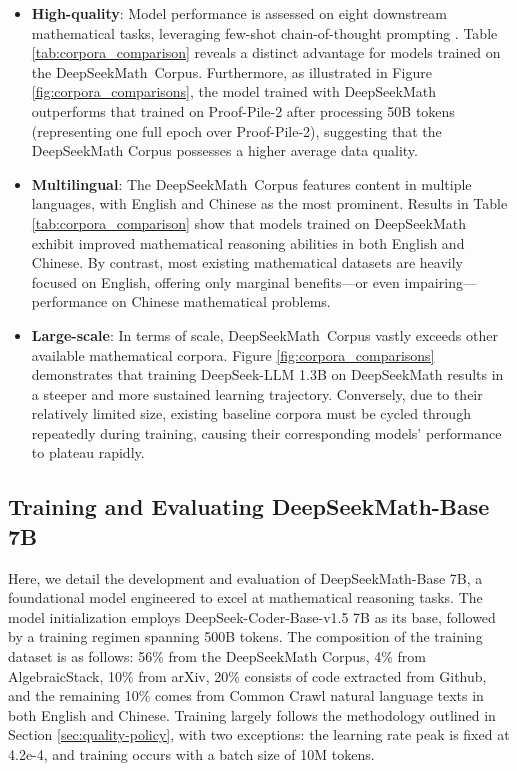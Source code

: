 \begin{itemize}[topsep=0pt]
    \item \textbf{High-quality}:
    Model performance is assessed on eight downstream mathematical tasks, leveraging few-shot chain-of-thought prompting \cite{cot}. Table \ref{tab:corpora_comparison} reveals a distinct advantage for models trained on the DeepSeekMath~Corpus. Furthermore, as illustrated in Figure \ref{fig:corpora_comparisons}, the model trained with DeepSeekMath outperforms that trained on Proof-Pile-2 after processing 50B tokens (representing one full epoch over Proof-Pile-2), suggesting that the DeepSeekMath Corpus possesses a higher average data quality.
    \item \textbf{Multilingual}:
    The DeepSeekMath~Corpus features content in multiple languages, with English and Chinese as the most prominent. Results in Table \ref{tab:corpora_comparison} show that models trained on DeepSeekMath exhibit improved mathematical reasoning abilities in both English and Chinese. By contrast, most existing mathematical datasets are heavily focused on English, offering only marginal benefits—or even impairing—performance on Chinese mathematical problems.
    \item \textbf{Large-scale}:
    In terms of scale, DeepSeekMath~Corpus vastly exceeds other available mathematical corpora. Figure \ref{fig:corpora_comparisons} demonstrates that training DeepSeek-LLM 1.3B on DeepSeekMath results in a steeper and more sustained learning trajectory. Conversely, due to their relatively limited size, existing baseline corpora must be cycled through repeatedly during training, causing their corresponding models’ performance to plateau rapidly.
\end{itemize}

\subsection{Training and Evaluating DeepSeekMath-Base 7B}

Here, we detail the development and evaluation of DeepSeekMath-Base 7B, a foundational model engineered to excel at mathematical reasoning tasks. The model initialization employs DeepSeek-Coder-Base-v1.5 7B \citep{deepseek-coder} as its base, followed by a training regimen spanning 500B tokens. The composition of the training dataset is as follows: 56\% from the DeepSeekMath Corpus, 4\% from AlgebraicStack, 10\% from arXiv, 20\% consists of code extracted from Github, and the remaining 10\% comes from Common Crawl natural language texts in both English and Chinese. Training largely follows the methodology outlined in Section \ref{sec:quality-policy}, with two exceptions: the learning rate peak is fixed at 4.2e-4, and training occurs with a batch size of 10M tokens.

